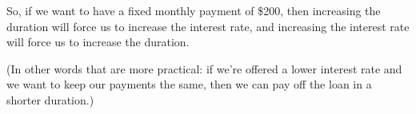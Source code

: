 \documentclass[10pt]{article}
\newenvironment{red}{\color{red}}{\ignorespacesafterend}
\begin{document}
\begin{enumerate}[leftmargin=0pt]
\begin{enumerate}
\begin{red}
        So, if we want to have a fixed monthly payment of \$200, then increasing the duration will force us to increase the interest rate, and increasing the interest rate will force us to increase the duration.
        
        (In other words that are more practical: if we're offered a lower interest rate and we want to keep our payments the same, then we can pay off the loan in a shorter duration.)
        \end{red}
    \end{enumerate}
\end{enumerate}
\end{document}
